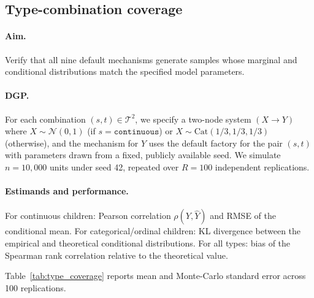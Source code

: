 \documentclass[12pt,a4paper]{article}
\begin{document}
\subsection{Type-combination coverage}
\label{sec:sim_types}

\paragraph{Aim.}
Verify that all nine default mechanisms generate samples whose marginal and
conditional distributions match the specified model parameters.

\paragraph{DGP.}
For each combination $(s,t) \in \mathcal{T}^2$, we specify a two-node system
$(X\to Y)$ where $X\sim\mathcal{N}(0,1)$ (if $s=\mathtt{continuous}$) or
$X\sim\mathrm{Cat}(1/3,1/3,1/3)$ (otherwise), and the mechanism for $Y$ uses
the default factory for the pair $(s,t)$ with parameters drawn from a fixed,
publicly available seed. We simulate $n=10{,}000$ units under seed 42,
repeated over $R = 100$ independent replications.

\paragraph{Estimands and performance.}
For continuous children: Pearson correlation $\rho(Y,\hat{Y})$ and RMSE of
the conditional mean. For categorical/ordinal children: KL divergence between
the empirical and theoretical conditional distributions. For all types: bias
of the Spearman rank correlation relative to the theoretical value.

Table~\ref{tab:type_coverage} reports mean and Monte-Carlo standard error
across 100 replications.
\end{document}
